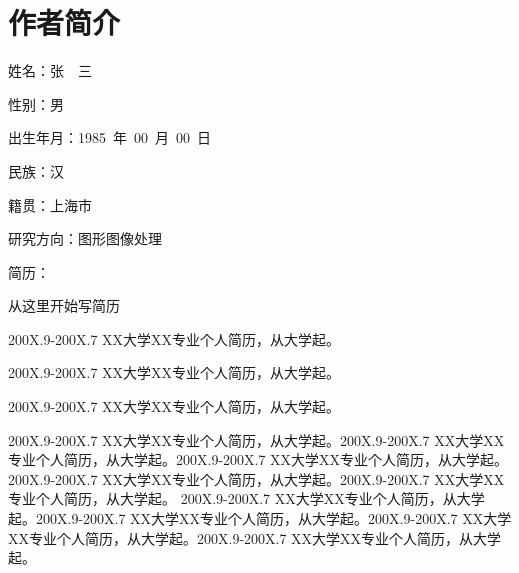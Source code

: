 ﻿%

%
%

\chapter*{\hfill 作者简介 \hfill}
\begin{window}
\end{window}
\daxiaosi
姓名：张　三

性别：男

出生年月：1985~年~00~月~00~日

民族：汉

籍贯：上海市

研究方向：图形图像处理

简历：

\xiaosi
从这里开始写简历

200X.9-200X.7  XX大学XX专业个人简历，从大学起。

200X.9-200X.7  XX大学XX专业个人简历，从大学起。

200X.9-200X.7  XX大学XX专业个人简历，从大学起。

200X.9-200X.7  XX大学XX专业个人简历，从大学起。200X.9-200X.7  XX大学XX专业个人简历，从大学起。200X.9-200X.7  XX大学XX专业个人简历，从大学起。200X.9-200X.7  XX大学XX专业个人简历，从大学起。200X.9-200X.7  XX大学XX专业个人简历，从大学起。
200X.9-200X.7  XX大学XX专业个人简历，从大学起。200X.9-200X.7  XX大学XX专业个人简历，从大学起。200X.9-200X.7  XX大学XX专业个人简历，从大学起。200X.9-200X.7  XX大学XX专业个人简历，从大学起。
